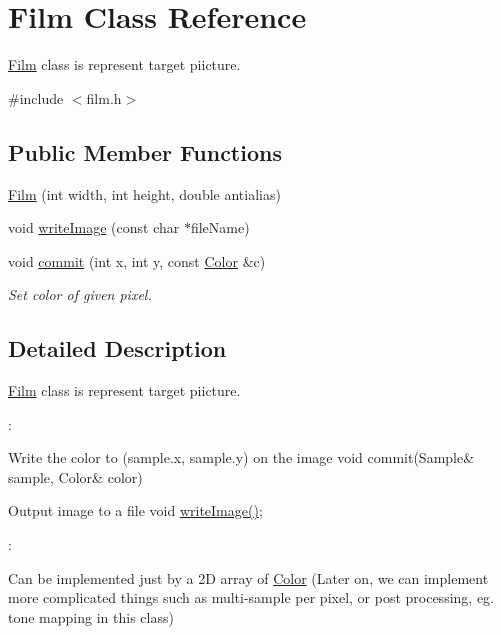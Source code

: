 \hypertarget{class_film}{}\section{Film Class Reference}
\label{class_film}


\mbox{\hyperlink{class_film}{Film}} class is represent target piicture.  




{\ttfamily \#include $<$film.\+h$>$}

\subsection*{Public Member Functions}
\begin{DoxyCompactItemize}
\item 
\mbox{\hyperlink{class_film_afc02973dd79cd6d5bd915285b5e068a1}{Film}} (int width, int height, double antialias)
\item 
void \mbox{\hyperlink{class_film_a4581cd3e307d06dd6e425f776a3af796}{write\+Image}} (const char $\ast$file\+Name)
\item 
\mbox{\label{class_film_a552b6312ff4adba3f2c5bc70586d3e38}} 
void \mbox{\hyperlink{class_film_a552b6312ff4adba3f2c5bc70586d3e38}{commit}} (int x, int y, const \mbox{\hyperlink{class_color}{Color}} \&c)
\begin{DoxyCompactList}\small\item\em Set color of given pixel. \end{DoxyCompactList}\end{DoxyCompactItemize}


\subsection{Detailed Description}
\mbox{\hyperlink{class_film}{Film}} class is represent target piicture. 

\+:

Write the color to (sample.\+x, sample.\+y) on the image void commit(\+Sample\& sample, Color\& color)

Output image to a file void \mbox{\hyperlink{class_film_a4581cd3e307d06dd6e425f776a3af796}{write\+Image()}};

\+:

Can be implemented just by a 2D array of \mbox{\hyperlink{class_color}{Color}} (Later on, we can implement more complicated things such as multi-\/sample per pixel, or post processing, eg. tone mapping in this class) 

